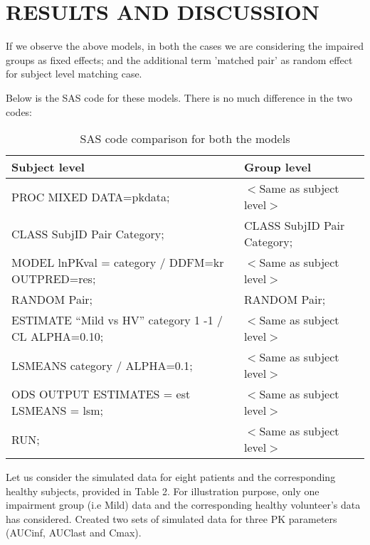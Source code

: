 \documentclass[final]{statistica}
\begin{document}
\section{RESULTS AND DISCUSSION}

If we observe the above models, in both the cases we are considering the impaired groups as fixed effects; and the additional term 'matched pair' as random effect for subject level matching case.
\vspace{3mm}
\par
Below is the SAS code for these models. There is no much difference in the two codes:
\vspace{3mm}

\begin{table}
	\centering
	\caption{SAS code comparison for both the models}\label{tab1}
	\begin{tabular}{|l|l|}
		\hline
		Subject level & Group level \\
		\hline
		PROC MIXED DATA=pkdata; & $<$Same as subject level$>$ \\
		CLASS SubjID Pair Category; & CLASS SubjID Pair Category; \\
		MODEL lnPKval = category / DDFM=kr OUTPRED=res; & $<$Same as subject level$>$ \\
		RANDOM Pair; & RANDOM Pair; \\
		ESTIMATE “Mild vs HV” category 1 -1 / CL ALPHA=0.10; & $<$Same as subject level$>$ \\
		LSMEANS category / ALPHA=0.1; & $<$Same as subject level$>$ \\
		ODS OUTPUT ESTIMATES = est LSMEANS = lsm; & $<$Same as subject level$>$ \\
		RUN; & $<$Same as subject level$>$ \\
		\hline
	\end{tabular}
\end{table}

\vspace{3mm}
\par
Let us consider the simulated data for eight patients and the corresponding healthy subjects, provided in Table 2. For illustration purpose, only one impairment group (i.e Mild) data and the corresponding healthy volunteer's data has considered. Created two sets of simulated data for three PK parameters (AUCinf, AUClast and Cmax).
\vspace{3mm}
\end{document}
